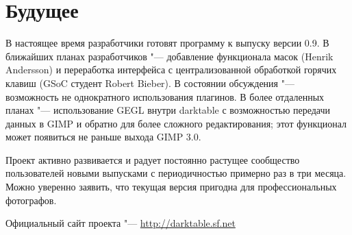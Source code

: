 \documentclass[10pt, a5paper]{article}
\begin{document}
\section*{Будущее}
В настоящее время разработчики готовят программу к выпуску версии 0.9. В ближайших планах разработчиков "--- добавление функционала масок (Henrik Andersson) и переработка интерфейса с централизованной обработкой горячих клавиш (GSoC студент Robert Bieber). В состоянии обсуждения "--- возможность не  однократного использования плагинов. В более отдаленных планах "--- использование GEGL внутри darktable с возможностью передачи данных в GIMP и обратно для более сложного редактирования; этот функционал может появиться не раньше выхода GIMP 3.0.

Проект активно развивается и радует постоянно растущее сообщество пользователей новыми выпусками с периодичностью примерно раз в три месяца. Можно уверенно заявить, что текущая версия пригодна для профессиональных фотографов.

\begin{thebibliography}{9}
 Официальный сайт проекта "--- \url{http://darktable.sf.net}
\end{thebibliography}
\end{document}
